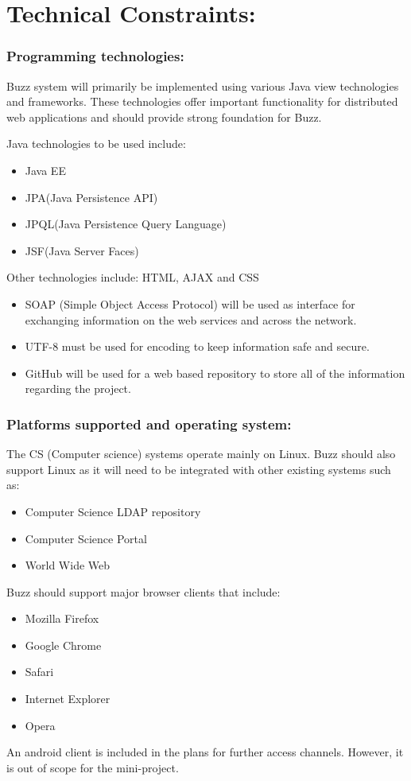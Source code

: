 \documentclass[11pt]{article}
\begin{document}
	\section{Technical Constraints:}
		\subsubsection{	Programming technologies:}
			\textbf{}Buzz system will primarily be implemented using various Java view technologies and frameworks. These technologies offer important functionality for distributed web applications and should provide strong foundation for Buzz.
		
		
	
			\textbf{}Java technologies to be used include:
   	\begin{itemize}		
			\item Java EE
			\item JPA(Java Persistence API)
			\item JPQL(Java  Persistence Query Language)
	 		\item JSF(Java Server Faces)
	\end{itemize}
		\textbf{} Other technologies include: HTML, AJAX and CSS
			\begin{itemize}		
			
		\item 	SOAP (Simple Object Access Protocol) will be used as interface for exchanging information on the web services and across the network.
		\item 	UTF-8 must be used for encoding to keep information safe and secure.
		
		\item 	GitHub will be used for a web based repository to store all of the information regarding the project.
			\end{itemize}
			\subsubsection{Platforms supported and operating system:}
		
			
			\textbf{}The CS (Computer science) systems operate mainly on Linux. Buzz should also support Linux as it will need to be integrated with other existing systems such as:
			\begin{itemize}		
				\item	Computer Science LDAP repository
				\item 	Computer Science Portal
				\item 	World Wide Web
			\end{itemize}
			\textbf{}Buzz should support major browser clients that include:
			\begin{itemize}		
					\item		Mozilla Firefox
					\item		Google Chrome
					\item		Safari
					\item		Internet Explorer
					\item		Opera
				
			\end{itemize}
			\textbf{}An android client is included in the plans for further access channels. However, it is out of scope for the mini-project.
\end{document}
